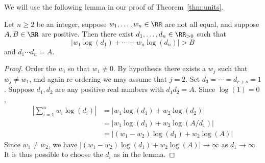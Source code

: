 We will use the following lemma in our
proof of Theorem~\ref{thm:units}.
\begin{lemma}\label{lem:chooseci}
  Let $n \geq 2$ be an integer, suppose $w_1,\dots,w_n \in \RR$
  are not all equal, and suppose $A, B \in \RR$ are positive. Then
  there exist $d_1,\dots,d_{n} \in \RR_{>0}$ such that
  \[
    \left|w_1\log(d_1)+\cdots +w_{n}\log(d_{n})\right| > B
  \]
  and $d_1\cdots d_n = A$.
\end{lemma}
\begin{proof}
  Order the $w_i$ so
  that $w_1\neq 0$.  By hypothesis there exists a $w_j$ such that
  $w_j\neq w_1$, and again re-ordering we may assume that $j=2$.  Set
  $d_3=\cdots=d_{r+s}=1$.  Suppose $d_1, d_2$ are any positive real numbers
  with  $d_1 d_2 = A$.  Since $\log(1)=0$,
  \begin{align*}
    \left|\sum_{i=1}^{n} w_i \log(d_i)\right|
    &= |w_1\log(d_1) + w_2\log(d_2)|\\
    &= |w_1 \log(d_1) + w_2\log(A/d_1)| \\
    &= |(w_1-w_2)\log(d_1) + w_2\log(A)|
  \end{align*}
  Since $w_1\neq w_2$,  we have $|(w_1-w_2)\log(d_1) + w_2\log(A)|\to\infty$
  as $d_1\to \infty$.  It is thus possible to choose the $d_i$ as in the lemma.
\end{proof}

